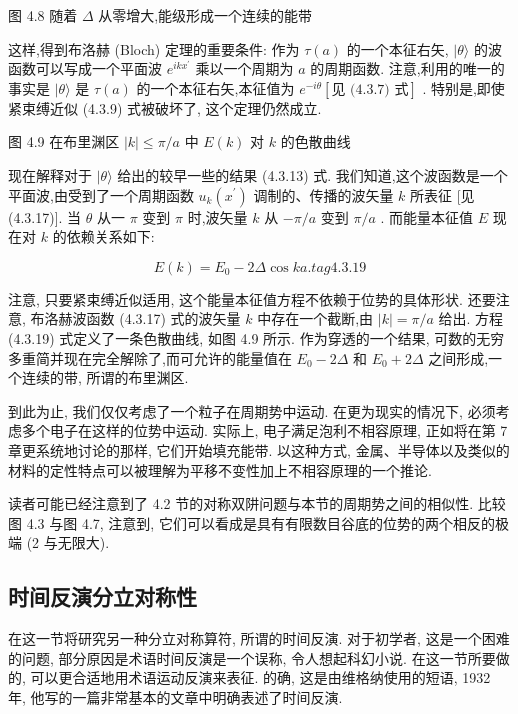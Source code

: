 图 4.8 随着 $\Delta$ 从零增大,能级形成一个连续的能带

这样,得到布洛赫 (Bloch) 定理的重要条件: 作为 $\tau \left( a\right)$ 的一个本征右矢, $|\theta \rangle$ 的波函数可以写成一个平面波 ${e}^{{ik}{x}^{\prime }}$ 乘以一个周期为 $a$ 的周期函数. 注意,利用的唯一的事实是 $|\theta \rangle$ 是 $\tau \left( a\right)$ 的一个本征右矢,本征值为 ${e}^{-{i\theta }}\left\lbrack \text{见 (4.3.7) 式}\right\rbrack$ . 特别是,即使紧束缚近似 (4.3.9) 式被破坏了, 这个定理仍然成立.


图 4.9 在布里渊区 $\left| k\right| \leq \pi /a$ 中 $E\left( k\right)$ 对 $k$ 的色散曲线

现在解释对于 $|\theta \rangle$ 给出的较早一些的结果 (4.3.13) 式. 我们知道,这个波函数是一个平面波,由受到了一个周期函数 ${u}_{k}\left( {x}^{\prime }\right)$ 调制的、传播的波矢量 $k$ 所表征 [见 (4.3.17)]. 当 $\theta$ 从一 $\pi$ 变到 $\pi$ 时,波矢量 $k$ 从 $- \pi /a$ 变到 $\pi /a$ . 而能量本征值 $E$ 现在对 $k$ 的依赖关系如下:

$$
E\left( k\right) = {E}_{0} - {2\Delta }\cos {ka}. tag{4.3.19}
$$

注意, 只要紧束缚近似适用, 这个能量本征值方程不依赖于位势的具体形状. 还要注意, 布洛赫波函数 (4.3.17) 式的波矢量 $k$ 中存在一个截断,由 $\left| k\right| = \pi /a$ 给出. 方程 (4.3.19) 式定义了一条色散曲线, 如图 4.9 所示. 作为穿透的一个结果, 可数的无穷多重简并现在完全解除了,而可允许的能量值在 ${E}_{0} - {2\Delta }$ 和 ${E}_{0} + {2\Delta }$ 之间形成,一个连续的带, 所谓的布里渊区.

到此为止, 我们仅仅考虑了一个粒子在周期势中运动. 在更为现实的情况下, 必须考虑多个电子在这样的位势中运动. 实际上, 电子满足泡利不相容原理, 正如将在第 7 章更系统地讨论的那样, 它们开始填充能带. 以这种方式, 金属、半导体以及类似的材料的定性特点可以被理解为平移不变性加上不相容原理的一个推论.

读者可能已经注意到了 4.2 节的对称双阱问题与本节的周期势之间的相似性. 比较图 4.3 与图 4.7, 注意到, 它们可以看成是具有有限数目谷底的位势的两个相反的极端 (2 与无限大).

\subsection{时间反演分立对称性}

在这一节将研究另一种分立对称算符, 所谓的时间反演. 对于初学者, 这是一个困难的问题, 部分原因是术语时间反演是一个误称, 令人想起科幻小说. 在这一节所要做的, 可以更合适地用术语运动反演来表征. 的确, 这是由维格纳使用的短语, 1932 年, 他写的一篇非常基本的文章中明确表述了时间反演.

